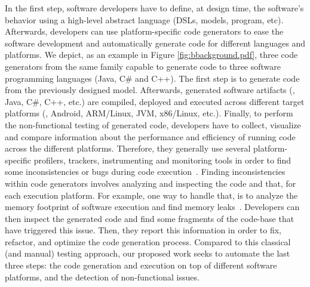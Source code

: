 In the first step, software developers have to define, at design time, the software's behavior using a high-level abstract language (DSLs, models, program, etc). Afterwards, developers can use platform-specific code generators to ease the software development and automatically generate code for different languages and platforms. We depict, as an example in Figure \ref{fig:bbackground.pdf}, three code generators from the same family capable to generate code to three software programming languages (Java, C\# and C++). The first step is to generate code from the previously designed model.
Afterwards, generated software artifacts (\eg, Java, C\#, C++, etc.) are compiled, deployed and executed across different target platforms (\eg, Android, ARM/Linux, JVM, x86/Linux, etc.). 
Finally, to perform the non-functional testing of generated code, developers have to collect, visualize and compare information about the performance and efficiency of running code across the different platforms. 
Therefore, they generally use several platform-specific profilers, trackers, instrumenting and monitoring tools in order to find some inconsistencies or bugs during code execution~\cite{guana2014chaintracker,delgado2004taxonomy}. Finding inconsistencies within code generators involves analyzing and inspecting the code and that, for each execution platform. For example, one way to handle that, is to analyze the memory footprint of software execution and find memory leaks~\cite{nethercote2007valgrind}. Developers can then inspect the generated code and find some fragments of the code-base that have triggered this issue. %
Then, they report this information in order to fix, refactor, and optimize the code generation process. Compared to this classical (and manual) testing approach, our proposed work seeks to automate the last three steps: the code generation and execution on top of different software platforms, and the detection of non-functional issues.


